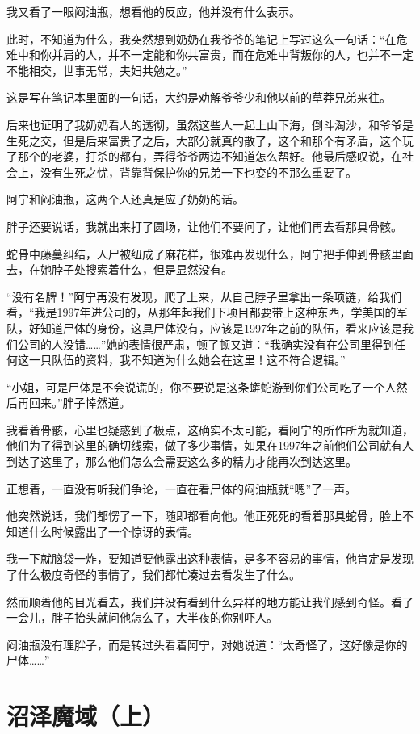 我又看了一眼闷油瓶，想看他的反应，他并没有什么表示。

此时，不知道为什么，我突然想到奶奶在我爷爷的笔记上写过这么一句话：“在危难中和你并肩的人，并不一定能和你共富贵，而在危难中背叛你的人，也并不一定不能相交，世事无常，夫妇共勉之。”

这是写在笔记本里面的一句话，大约是劝解爷爷少和他以前的草莽兄弟来往。

后来也证明了我奶奶看人的透彻，虽然这些人一起上山下海，倒斗淘沙，和爷爷是生死之交，但是后来富贵了之后，大部分就真的散了，这个和那个有矛盾，这个玩了那个的老婆，打杀的都有，弄得爷爷两边不知道怎么帮好。他最后感叹说，在社会上，没有生死之忧，背靠背保护你的兄弟一下也变的不那么重要了。

阿宁和闷油瓶，这两个人还真是应了奶奶的话。

胖子还要说话，我就出来打了圆场，让他们不要问了，让他们再去看那具骨骸。

蛇骨中藤蔓纠结，人尸被纽成了麻花样，很难再发现什么，阿宁把手伸到骨骸里面去，在她脖子处搜索着什么，但是显然没有。

“没有名牌！”阿宁再没有发现，爬了上来，从自己脖子里拿出一条项链，给我们看，“我是1997年进公司的，从那年起我们下项目都要带上这种东西，学美国的军队，好知道尸体的身份，这具尸体没有，应该是1997年之前的队伍，看来应该是我们公司的人没错……”她的表情很严肃，顿了顿又道：“我确实没有在公司里得到任何这一只队伍的资料，我不知道为什么她会在这里！这不符合逻辑。”

“小姐，可是尸体是不会说谎的，你不要说是这条蟒蛇游到你们公司吃了一个人然后再回来。”胖子悻然道。

我看着骨骸，心里也疑惑到了极点，这确实不太可能，看阿宁的所作所为就知道，他们为了得到这里的确切线索，做了多少事情，如果在1997年之前他们公司就有人到达了这里了，那么他们怎么会需要这么多的精力才能再次到达这里。

正想着，一直没有听我们争论，一直在看尸体的闷油瓶就“嗯”了一声。

他突然说话，我们都愣了一下，随即都看向他。他正死死的看着那具蛇骨，脸上不知道什么时候露出了一个惊讶的表情。

我一下就脑袋一炸，要知道要他露出这种表情，是多不容易的事情，他肯定是发现了什么极度奇怪的事情了，我们都忙凑过去看发生了什么。

然而顺着他的目光看去，我们并没有看到什么异样的地方能让我们感到奇怪。看了一会儿，胖子抬头就问他怎么了，大半夜的你别吓人。

闷油瓶没有理胖子，而是转过头看着阿宁，对她说道：“太奇怪了，这好像是你的尸体……”

\chapter{沼泽魔域（上）}

